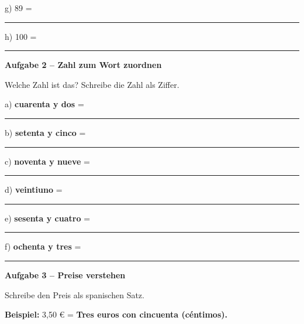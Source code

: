 \documentclass[11pt, a4paper]{article}
\newcommand{\fachfarbe}{spanisch}
\newcommand{\punktebox}[1]{\hfill\fbox{\small \_/#1}}
\newcommand{\luecke}[1]{\rule{#1}{0.4pt}}
\newenvironment{aufgabe}[1]{%
    \needspace{5\baselineskip}%
    \nopagebreak[4]%
    \vspace{10pt}
    \noindent\textbf{\textcolor{\fachfarbe}{Aufgabe #1}}
    \nopagebreak[4]%
    \vspace{5pt}
    \nopagebreak[4]%
    \begin{list}{}{\leftmargin=0pt}
    \item[]
}{%
    \end{list}
}
\newcommand{\es}[1]{\textcolor{\fachfarbe}{\textbf{#1}}}
\begin{document}
\vspace{0.8em}

\noindent
g) 89 = \luecke{5cm}

\vspace{0.8em}

\noindent
h) 100 = \luecke{5cm}

\vspace{15pt}


\begin{aufgabe}{2 -- Zahl zum Wort zuordnen}
Welche Zahl ist das? Schreibe die Zahl als Ziffer. \punktebox{6}
\end{aufgabe}

\noindent
a) \es{cuarenta y dos} = \luecke{2cm}

\vspace{0.8em}

\noindent
b) \es{setenta y cinco} = \luecke{2cm}

\vspace{0.8em}

\noindent
c) \es{noventa y nueve} = \luecke{2cm}

\vspace{0.8em}

\noindent
d) \es{veintiuno} = \luecke{2cm}

\vspace{0.8em}

\noindent
e) \es{sesenta y cuatro} = \luecke{2cm}

\vspace{0.8em}

\noindent
f) \es{ochenta y tres} = \luecke{2cm}

\vspace{15pt}


\begin{aufgabe}{3 -- Preise verstehen}
Schreibe den Preis als spanischen Satz. \punktebox{6}
\end{aufgabe}

\begin{hinweis}
\textbf{Beispiel:} 3,50 € = \es{Tres euros con cincuenta (céntimos).}
\end{hinweis}
\end{document}
